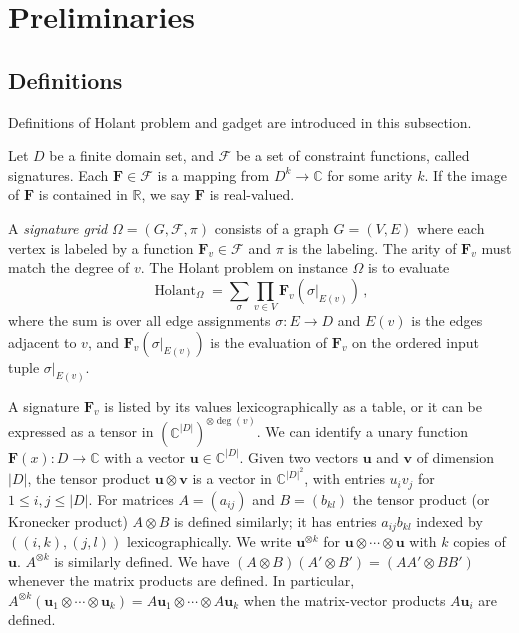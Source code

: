 \documentclass[11pt]{article}
\DeclareMathOperator{\hol}{Holant}
\begin{document}
\section{Preliminaries}
\subsection{Definitions}
Definitions of Holant problem and gadget are introduced in this subsection.

Let $D$ be a finite domain set, and $\mathcal{F}$ be a set of constraint functions, called signatures.
Each $\mathbf{F} \in \mathcal{F}$ is a mapping from $D^k \to \mathbb{C}$ for some arity $k$.
If the image of $\mathbf{F}$ is contained in $\mathbb{R}$, we say $\mathbf{F}$ is real-valued.

A \textit{signature grid} $\Omega = (G, \mathcal{F}, \pi)$ consists of a graph $G = (V, E)$ where each vertex is labeled by
a function $\mathbf{F}_v \in \mathcal{F}$ and $\pi$ is the labeling.
The arity of $\mathbf{F}_v$ must match the degree of $v$.
The Holant problem on instance $\Omega$ is to evaluate
\begin{equation}
  \hol_{\Omega} = \sum_{\sigma} \prod_{v \in V} \mathbf{F}_v(\sigma |_{E(v)}) \, ,
\end{equation}
where the sum is over all edge assignments $\sigma : E \to D$ and $E(v)$ is the edges adjacent to $v$, and $\mathbf{F}_v(\sigma |_{E(v)})$ is the evaluation of $\mathbf{F}_v$ on the ordered input tuple $\sigma |_{E(v)}$.

A signature $\mathbf{F}_v$ is listed by its values lexicographically as a table, or it can be expressed as a tensor in $(\mathbb{C}^{\lvert D \rvert})^{\otimes \deg(v)}$.
We can identify a unary function $\mathbf{F}(x): D \to \mathbb{C}$ with a vector $\mathbf{u} \in \mathbb{C}^{\lvert D \rvert}$.
Given two vectors $\mathbf{u}$ and $\mathbf{v}$ of dimension $\lvert D \rvert$, the tensor product $\mathbf{u} \otimes \mathbf{v}$ is a vector in 
$\mathbb{C}^{\lvert D \rvert^2}$, with entries $u_i v_j$ for $1 \le i, j \le \lvert D \rvert$.
For matrices $A = (a_{ij})$ and $B = (b_{kl})$ the tensor product (or Kronecker product) $A \otimes B$ is defined similarly;
it has entries $a_{ij}b_{kl}$ indexed by $((i, k), (j, l))$ lexicographically.
We write $\mathbf{u}^{\otimes k}$ for $\mathbf{u}\otimes \cdots \otimes \mathbf{u}$ with $k$ copies of $\mathbf{u}$.
$A^{\otimes k}$ is similarly defined.
We have $(A \otimes B)(A' \otimes B') = (A A' \otimes BB')$ whenever the matrix products are defined.
In particular, $A^{\otimes k}(\mathbf{u}_1 \otimes \cdots \otimes \mathbf{u}_k) = A \mathbf{u}_1 \otimes \cdots \otimes A \mathbf{u}_k$ when the matrix-vector 
products $A \mathbf{u}_i$ are defined.
\end{document}
